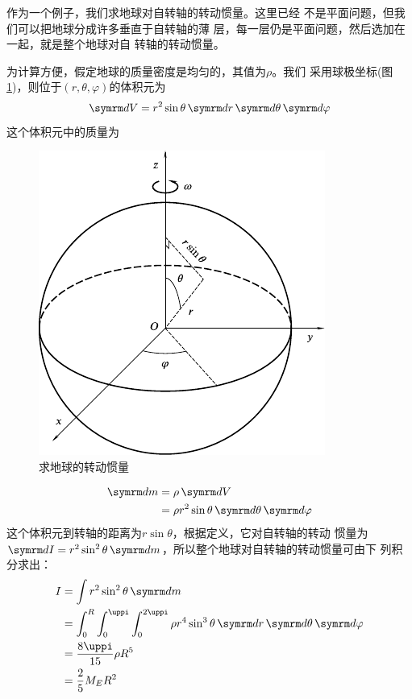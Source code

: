 作为一个例子，我们求地球对自转轴的转动惯量。这里已经
不是平面问题，但我们可以把地球分成许多垂直于自转轴的薄
层，每一层仍是平面问题，然后选加在一起，就是整个地球对自
转轴的转动惯量。

为计算方便，假定地球的质量密度是均匀的，其值为$ \rho $。我们
采用球极坐标(图\ref{fig:09.13})，则位于$ \left( r, \theta, \varphi \right) $的体积元为
\begin{equation*}
  \dif V = r ^ { 2 } \sin \theta \dif r \dif \theta \dif \varphi
\end{equation*}
这个体积元中的质量为

\begin{figure}[h]
  \centering
  \includegraphics{figure/fig09.13}
  \caption{求地球的转动惯量}
  \label{fig:09.13}
\end{figure}
\begin{equation*}
  \begin{split}
    \dif m &= \rho \dif V \\
    &= \rho r ^ { 2 } \sin \theta \dif \theta \dif \varphi
  \end{split}
\end{equation*}
这个体积元到转轴的距离为$ r \sin \theta $，根据定义，它对自转轴的转动
惯量为$ \dif I = r ^ { 2 } \sin ^ { 2 } \theta \dif m $，所以整个地球对自转轴的转动惯量可由下
列积分求出：
\begin{equation*}
  \begin{split}
    I &= \int r ^ { 2 } \sin ^ { 2 } \theta \dif m \\
    &= \int _ 0 ^ { R } \int _ 0 ^ { \uppi } \int _ 0 ^ { 2 \uppi } \rho r ^ { 4 } \sin ^ { 3 } \theta \dif r \dif \theta \dif \varphi \\
    &= \frac { 8 \uppi } { 1 5 } \rho R ^ { 5 } \\
    &= \frac { 2 } { 5 } M _ { E } R ^ { 2 }
  \end{split}
\end{equation*}

